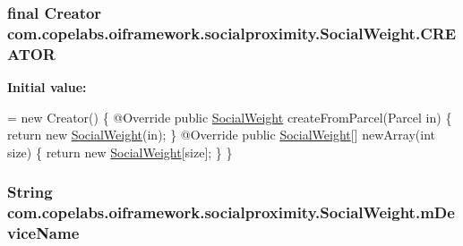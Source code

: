 \subsubsection[{C\+R\+E\+A\+T\+O\+R}]{\setlength{\rightskip}{0pt plus 5cm}final Creator com.\+copelabs.\+oiframework.\+socialproximity.\+Social\+Weight.\+C\+R\+E\+A\+T\+O\+R}\label{classcom_1_1copelabs_1_1oiframework_1_1socialproximity_1_1_social_weight_a6bcb16eb1fe0d7db7cc1ca394b863efd}
{\bfseries Initial value\+:}
\begin{DoxyCode}
= \textcolor{keyword}{new} Creator() \{
        @Override
        \textcolor{keyword}{public} \hyperlink{classcom_1_1copelabs_1_1oiframework_1_1socialproximity_1_1_social_weight_adb73b95da859d4f5141ad6e193a3a12a}{SocialWeight} createFromParcel(Parcel in) \{
            \textcolor{keywordflow}{return} \textcolor{keyword}{new} \hyperlink{classcom_1_1copelabs_1_1oiframework_1_1socialproximity_1_1_social_weight_adb73b95da859d4f5141ad6e193a3a12a}{SocialWeight}(in);
        \}
        @Override
        \textcolor{keyword}{public} \hyperlink{classcom_1_1copelabs_1_1oiframework_1_1socialproximity_1_1_social_weight_adb73b95da859d4f5141ad6e193a3a12a}{SocialWeight}[] newArray(\textcolor{keywordtype}{int} size) \{
            \textcolor{keywordflow}{return} \textcolor{keyword}{new} \hyperlink{classcom_1_1copelabs_1_1oiframework_1_1socialproximity_1_1_social_weight_adb73b95da859d4f5141ad6e193a3a12a}{SocialWeight}[size];
        \}
    \}
\end{DoxyCode}
\hypertarget{classcom_1_1copelabs_1_1oiframework_1_1socialproximity_1_1_social_weight_a6fa473ff39400696fd831ca519170610}{}
\subsubsection[{m\+Device\+Name}]{\setlength{\rightskip}{0pt plus 5cm}String com.\+copelabs.\+oiframework.\+socialproximity.\+Social\+Weight.\+m\+Device\+Name\hspace{0.3cm}{\ttfamily [private]}}\label{classcom_1_1copelabs_1_1oiframework_1_1socialproximity_1_1_social_weight_a6fa473ff39400696fd831ca519170610}
\hypertarget{classcom_1_1copelabs_1_1oiframework_1_1socialproximity_1_1_social_weight_a93b91c868be4a9d3e395d46242ab96c4}{}
